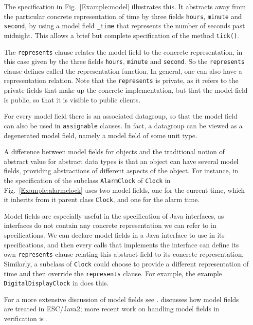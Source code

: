 \documentclass{llncs}
\begin{document}
The specification in Fig.~\ref{Example:model} illustrates this.
It abstracts away from the particular concrete representation of time
by three fields \texttt{hours}, \texttt{minute} and \texttt{second},
by using a model field \texttt{\_time} that represents the number of seconds
past midnight.
This allows a brief but complete specification of the method \texttt{tick()}.

The \texttt{represents} clause relates the model field to the concrete representation,
in this case given by the three fields  \texttt{hours}, \texttt{minute} and 
\texttt{second}. So the \texttt{represents} clause defines called the 
representation function. In general, one can also have a representation relation.
Note that the \texttt{represents} is private, as it refers to the private
fields that make up the concrete implementation, but that the model field
is public, so that it is visible to public clients.

For every model field there is an associated datagroup, so that the 
model field can also be used in \texttt{assignable} clauses.
In fact, a datagroup can be viewed as a degenerated model field, namely
a model field of some unit type.

A difference between model fields for objects and the traditional notion of
abstract value for abstract data types is that an object can have several
model fields, providing abstractions of different aspects of the object.
For instance, in the specification of the subclass \texttt{AlarmClock}
of \texttt{Clock} in Fig.~\ref{Example:alarmclock} uses 
two model fields, one for the current time, which it inherits from
it parent class \texttt{Clock}, and one for the alarm time.

Model fields are especially useful in the specification of Java interfaces,
as interfaces do not contain any concrete representation we can refer
to in specifications. We can declare model fields in a Java interface
to use in its specifications, and then every calls that implements 
the interface can define its own \texttt{represents} clause relating
this abstract field to its concrete representation. Similarly, a subclass
of \texttt{Clock} could choose to provide a different representation
of time and then override the \texttt{represents} clause. For example,
the example \texttt{DigitalDisplayClock} in 
does this.

For a more extensive discussion of model fields see \cite{Cheon-etal05}.
\cite{Cok05} discusses how model fields are treated in ESC/Java2;
more recent work on handling model fields in verification is \cite{LeinoMuller06}.
\end{document}
